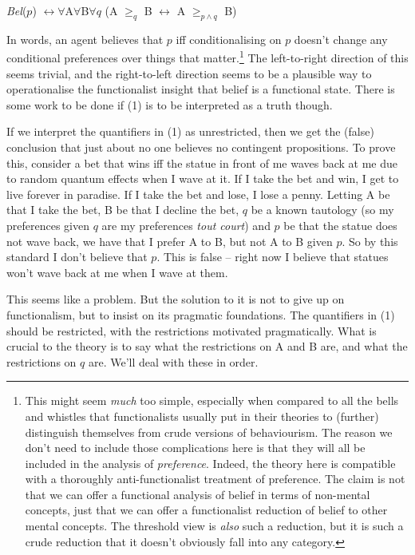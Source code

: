 \begin{enumerate*}
\item \textit{Bel}(\(p\)) \(\leftrightarrow \forall\)A\(\forall\)B\(\forall q\) (A \(\geq _q\) B \(\leftrightarrow\) A \(\geq _{p \wedge q}\) B)
\end{enumerate*}

\noindent In words, an agent believes that \(p\) iff conditionalising on \(p\) doesn't change any conditional preferences over things that matter.\footnote{This might seem \textit{much} too simple, especially when compared to all the bells and whistles that functionalists usually put in their theories to (further) distinguish themselves from crude versions of behaviourism. The reason we don't need to include those complications here is that they will all be included in the analysis of \textit{preference}. Indeed, the theory here is compatible with a thoroughly anti\nobreakdash-functionalist treatment of preference. The claim is not that we can offer a functional analysis of belief in terms of non-mental concepts, just that we can offer a functionalist reduction of belief to other mental concepts. The threshold view is \textit{also} such a reduction, but it is such a crude reduction that it doesn't obviously fall into any category.} The left-to-right direction of this seems trivial, and the right\nobreakdash-to\nobreakdash-left direction seems to be a plausible way to operationalise the functionalist insight that belief is a functional state. There is some work to be done if (1) is to be interpreted as a truth though.

If we interpret the quantifiers in (1) as unrestricted, then we get the (false) conclusion that just about no one believes no contingent propositions. To prove this, consider a bet that wins iff the statue in front of me waves back at me due to random quantum effects when I wave at it. If I take the bet and win, I get to live forever in paradise. If I take the bet and lose, I lose a penny. Letting A be that I take the bet, B be that I decline the bet, \(q\) be a known tautology (so my preferences given \(q\) are my preferences \textit{tout court}) and \(p\) be that the statue does not wave back, we have that I prefer A to B, but not A to B given \(p\). So by this standard I don't believe that \(p\). This is false -- right now I believe that statues won't wave back at me when I wave at them.

This seems like a problem. But the solution to it is not to give up on functionalism, but to insist on its pragmatic foundations. The quantifiers in (1) should be restricted, with the restrictions motivated pragmatically. What is crucial to the theory is to say what the restrictions on A and B are, and what the restrictions on \(q\) are. We'll deal with these in order.

